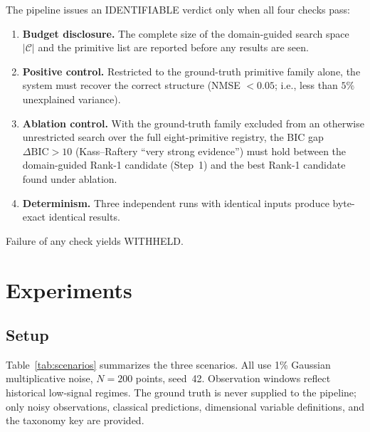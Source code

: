 \documentclass{article}
\begin{document}
The pipeline issues an IDENTIFIABLE verdict only when all four checks pass:
\begin{enumerate}[noitemsep,leftmargin=*]
  \item \textbf{Budget disclosure.} The complete size of the domain-guided
        search space $|\mathcal{C}|$ and the primitive list are reported before any results are seen.
  \item \textbf{Positive control.} Restricted to the ground-truth primitive
        family alone, the system must recover the correct structure
        (NMSE $<0.05$; i.e., less than $5\%$ unexplained variance).
  \item \textbf{Ablation control.} With the ground-truth family excluded from
        an otherwise unrestricted search over the full eight-primitive
        registry, the BIC gap $\Delta\mathrm{BIC}>10$ (Kass--Raftery ``very
        strong evidence'') must hold between the domain-guided Rank-1
        candidate (Step~1) and the best Rank-1 candidate found under ablation.
  \item \textbf{Determinism.} Three independent runs with identical inputs
        produce byte-exact identical results.
\end{enumerate}
Failure of any check yields WITHHELD.

\section{Experiments}

\subsection{Setup}

Table~\ref{tab:scenarios} summarizes the three scenarios.
All use 1\% Gaussian multiplicative noise, $N=200$ points, seed~42.
Observation windows reflect historical low-signal regimes.
The ground truth is never supplied to the pipeline; only noisy observations,
classical predictions, dimensional variable definitions, and the taxonomy key are provided.
\end{document}

